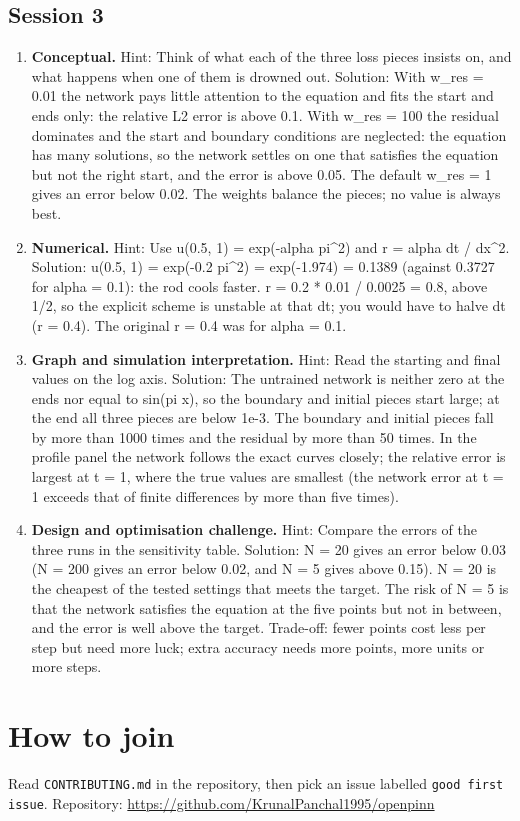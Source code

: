 \documentclass[11pt,a4paper]{article}
\begin{document}
\subsection*{Session 3}
\begin{enumerate}[nosep]
\item \textbf{Conceptual.} Hint: Think of what each of the three loss pieces insists on, and what happens when one of them is drowned out. Solution: With w\_res = 0.01 the network pays little attention to the equation and fits the start and ends only: the relative L2 error is above 0.1. With w\_res = 100 the residual dominates and the start and boundary conditions are neglected: the equation has many solutions, so the network settles on one that satisfies the equation but not the right start, and the error is above 0.05. The default w\_res = 1 gives an error below 0.02. The weights balance the pieces; no value is always best.
\item \textbf{Numerical.} Hint: Use u(0.5, 1) = exp(-alpha pi\textasciicircum{}2) and r = alpha dt / dx\textasciicircum{}2. Solution: u(0.5, 1) = exp(-0.2 pi\textasciicircum{}2) = exp(-1.974) = 0.1389 (against 0.3727 for alpha = 0.1): the rod cools faster. r = 0.2 * 0.01 / 0.0025 = 0.8, above 1/2, so the explicit scheme is unstable at that dt; you would have to halve dt (r = 0.4). The original r = 0.4 was for alpha = 0.1.
\item \textbf{Graph and simulation interpretation.} Hint: Read the starting and final values on the log axis. Solution: The untrained network is neither zero at the ends nor equal to sin(pi x), so the boundary and initial pieces start large; at the end all three pieces are below 1e-3. The boundary and initial pieces fall by more than 1000 times and the residual by more than 50 times. In the profile panel the network follows the exact curves closely; the relative error is largest at t = 1, where the true values are smallest (the network error at t = 1 exceeds that of finite differences by more than five times).
\item \textbf{Design and optimisation challenge.} Hint: Compare the errors of the three runs in the sensitivity table. Solution: N = 20 gives an error below 0.03 (N = 200 gives an error below 0.02, and N = 5 gives above 0.15). N = 20 is the cheapest of the tested settings that meets the target. The risk of N = 5 is that the network satisfies the equation at the five points but not in between, and the error is well above the target. Trade-off: fewer points cost less per step but need more luck; extra accuracy needs more points, more units or more steps.
\end{enumerate}

\section{How to join}
Read \texttt{CONTRIBUTING.md} in the repository, then pick an issue labelled \texttt{good first issue}. Repository: \url{https://github.com/KrunalPanchal1995/openpinn}
\end{document}
